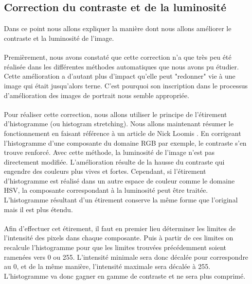 \documentclass[11pt, french]{report-rd-info}
\begin{document}
\subsection{Correction du contraste et de la luminosité}
\label{part:contraste}
\paragraph*{}
Dans ce point nous allons expliquer la manière dont nous allons améliorer le contraste et la luminosité de l'image. 
\paragraph*{}
Premièrement, nous avons constaté que cette correction n'a que très peu été réalisée dans les différentes méthodes automatiques que nous avons pu étudier. Cette amélioration a d'autant plus d'impact qu'elle peut "redonner" vie à une image qui était jusqu'alors terne. C'est pourquoi son inscription dans le processus d'amélioration des images de portrait nous semble appropriée.
\paragraph*{}
Pour réaliser cette correction, nous allons utiliser le principe de l'étirement d'histogramme (ou histogram stretching). Nous allons maintenant résumer le fonctionnement en faisant référence à un article de Nick Loomis \cite{Loomis2013}. En corrigeant l'histogramme d'une composante du domaine RGB par exemple, le contraste s'en trouve renforcé. Avec cette méthode, la luminosité de l'image n'est pas directement modifiée.
L'amélioration résulte de la hausse du contraste qui engendre des couleurs plus vives et fortes. Cependant, si l'étirement d'histogramme est réalisé dans un autre espace de couleur comme le domaine HSV, la composante correspondant à la luminosité peut être traitée. L'histogramme résultant d'un étirement conserve la même forme que l'original mais il est plus étendu.
\paragraph*{}
Afin d'effectuer cet étirement, il faut en premier lieu déterminer les limites de l'intensité des pixels dans chaque composante. Puis à partir de ces limites on recalcule l'histogramme pour que les limites trouvées précédemment soient ramenées vers 0 ou 255. L'intensité minimale sera donc décalée pour correspondre au 0, et de la même manière, l'intensité maximale sera décalée à 255. L'histogramme va donc gagner en gamme de contraste et ne sera plus comprimé.
\end{document}
